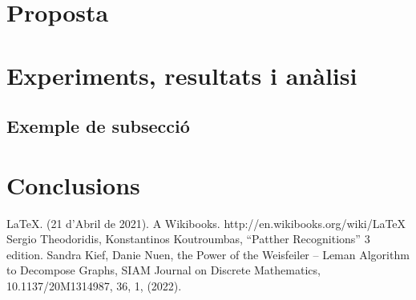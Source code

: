 ﻿\documentclass[10pt,a4paper,twocolumn,twoside]{article}
\begin{document}
\section{Proposta}


 
\section{Experiments, resultats i anàlisi}



\subsection{Exemple de subsecció}





\section{Conclusions}




\begin{thebibliography}{9}
 \LaTeX. (21 d'Abril de 2021). A Wikibooks. http://en.wikibooks.org/wiki/LaTeX
 Sergio Theodoridis, Konstantinos Koutroumbas, “Patther Recognitions” 3 edition.
 Sandra Kief, Danie Nuen, the Power of the Weisfeiler – Leman Algorithm to Decompose Graphs, SIAM Journal on Discrete Mathematics, 10.1137/20M1314987, 36, 1, (2022).


\end{thebibliography}
\end{document}
